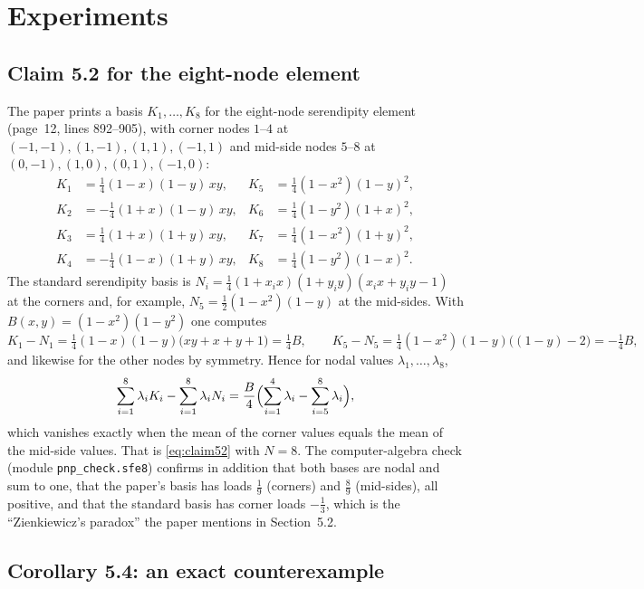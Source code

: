 \documentclass[11pt,a4paper]{article}
\begin{document}
\section{Experiments}

\subsection{Claim 5.2 for the eight-node element}
\label{sec:sfe8}

The paper prints a basis $K_1,\ldots,K_8$ for the eight-node serendipity element (page~12, lines 892--905), with corner nodes $1$--$4$ at $(-1,-1),(1,-1),(1,1),(-1,1)$ and mid-side nodes $5$--$8$ at $(0,-1),(1,0),(0,1),(-1,0)$:
\begin{align*}
K_1&=\tfrac14(1-x)(1-y)\,xy, & K_5&=\tfrac14(1-x^2)(1-y)^2,\\
K_2&=-\tfrac14(1+x)(1-y)\,xy, & K_6&=\tfrac14(1-y^2)(1+x)^2,\\
K_3&=\tfrac14(1+x)(1+y)\,xy, & K_7&=\tfrac14(1-x^2)(1+y)^2,\\
K_4&=-\tfrac14(1-x)(1+y)\,xy, & K_8&=\tfrac14(1-y^2)(1-x)^2.
\end{align*}
The standard serendipity basis \cite{zienkiewicz} is $N_i=\frac14(1+x_ix)(1+y_iy)(x_ix+y_iy-1)$ at the corners and, for example, $N_5=\frac12(1-x^2)(1-y)$ at the mid-sides. With $B(x,y)=(1-x^2)(1-y^2)$ one computes
\[
K_1-N_1=\tfrac14(1-x)(1-y)\bigl(xy+x+y+1\bigr)=\tfrac14 B,\qquad
K_5-N_5=\tfrac14(1-x^2)(1-y)\bigl((1-y)-2\bigr)=-\tfrac14 B,
\]
and likewise for the other nodes by symmetry. Hence for nodal values $\lambda_1,\ldots,\lambda_8$,
\[
\sum_{i=1}^8\lambda_i K_i-\sum_{i=1}^8\lambda_i N_i=\frac{B}{4}\Bigl(\sum_{i=1}^4\lambda_i-\sum_{i=5}^8\lambda_i\Bigr),
\]
which vanishes exactly when the mean of the corner values equals the mean of the mid-side values. That is \eqref{eq:claim52} with $N=8$. The computer-algebra check (module \texttt{pnp\_check.sfe8}) confirms in addition that both bases are nodal and sum to one, that the paper's basis has loads $\frac19$ (corners) and $\frac89$ (mid-sides), all positive, and that the standard basis has corner loads $-\frac13$, which is the ``Zienkiewicz's paradox'' the paper mentions in Section~5.2.

\subsection{Corollary 5.4: an exact counterexample}
\label{sec:cor54}
\end{document}

